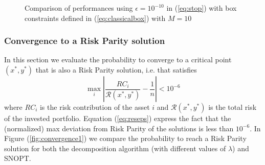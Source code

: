 \begin{figure}
{{
}
}
\caption{Comparison of performances using $\epsilon = 10^{-10}$ in (\ref{eq:stop}) with box constraints defined in (\ref{eq:classicalbox}) with $M=10$}
\label{fig:10}
\end{figure}

\subsubsection{Convergence to a Risk Parity solution}
In this section we evaluate the probability to converge to a critical point $(x^*,y^*)$ that is also a Risk Parity solution, i.e. that satisfies 
\begin{equation}\label{eq:reseps}
\max_i \left| \frac{RC_i}{\mathcal{R}(x^*,y^*)} - \frac{1}{n} \right| < 10^{-6}
\end{equation}
where $RC_i$ is the risk contribution of the asset $i$ and ${\mathcal{R}(x^*,y^*)}$ is the total risk of the invested portfolio. Equation (\ref{eq:reseps}) express the fact that the (normalized) max deviation from Risk Parity of the solutions is less than $10^{-6}$. In Figure (\ref{fig:convergence1}) we compare the probability to reach a Risk Parity solution for both the decomposition algorithm (with different values of $\lambda$) and SNOPT. 

